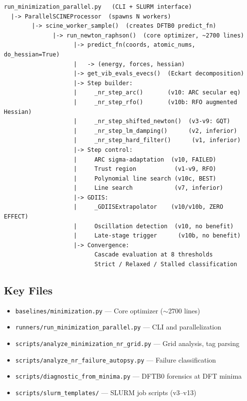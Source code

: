\documentclass[11pt,a4paper]{article}
\theoremstyle{definition}
\begin{document}
\begin{verbatim}
run_minimization_parallel.py   (CLI + SLURM interface)
  |-> ParallelSCINEProcessor  (spawns N workers)
        |-> scine_worker_sample()  (creates DFTB0 predict_fn)
              |-> run_newton_raphson()  (core optimizer, ~2700 lines)
                    |-> predict_fn(coords, atomic_nums, do_hessian=True)
                    |   -> (energy, forces, hessian)
                    |-> get_vib_evals_evecs()  (Eckart decomposition)
                    |-> Step builder:
                    |     _nr_step_arc()       (v10: ARC secular eq)
                    |     _nr_step_rfo()       (v10b: RFO augmented Hessian)
                    |     _nr_step_shifted_newton()  (v3-v9: GQT)
                    |     _nr_step_lm_damping()      (v2, inferior)
                    |     _nr_step_hard_filter()      (v1, inferior)
                    |-> Step control:
                    |     ARC sigma-adaptation  (v10, FAILED)
                    |     Trust region           (v1-v9, RFO)
                    |     Polynomial line search (v10c, BEST)
                    |     Line search            (v7, inferior)
                    |-> GDIIS:
                    |     _GDIISExtrapolator    (v10/v10b, ZERO EFFECT)
                    |     Oscillation detection  (v10, no benefit)
                    |     Late-stage trigger      (v10b, no benefit)
                    |-> Convergence:
                          Cascade evaluation at 8 thresholds
                          Strict / Relaxed / Stalled classification
\end{verbatim}

\subsection{Key Files}
\begin{itemize}[nosep]
  \item \texttt{baselines/minimization.py} --- Core optimizer ($\sim$2700 lines)
  \item \texttt{runners/run\_minimization\_parallel.py} --- CLI and parallelization
  \item \texttt{scripts/analyze\_minimization\_nr\_grid.py} --- Grid analysis, tag parsing
  \item \texttt{scripts/analyze\_nr\_failure\_autopsy.py} --- Failure classification
  \item \texttt{scripts/diagnostic\_from\_minima.py} --- DFTB0 forensics at DFT minima
  \item \texttt{scripts/slurm\_templates/} --- SLURM job scripts (v3--v13)
\end{itemize}
\end{document}
